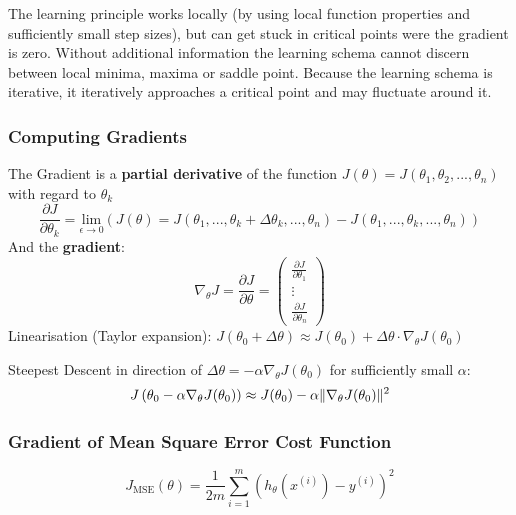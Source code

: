 \documentclass[11pt]{article}
\DeclarePairedDelimiter\norm{\lVert}{\rVert}
\begin{document}
The learning principle works locally (by using local function properties and sufficiently small step sizes), but can get stuck in critical points were the gradient is zero. Without additional information the learning schema cannot discern between local minima, maxima or saddle point. Because the learning schema is iterative, it iteratively approaches a critical point and may fluctuate around it.

\subsubsection{Computing Gradients}

The Gradient is a \textbf{partial derivative} of the function $J(\theta) = J(\theta_1,\theta_2,...,\theta_n)$ with regard to $\theta_k$
\begin{equation*}
	\frac{\partial J}{\partial\theta_k} = \underset{\epsilon\rightarrow0}{\text{lim}}\left( J(\theta) = J(\theta_1,...,\theta_k+\Delta\theta_k,...,\theta_n) - J(\theta_1,...,\theta_k,...,\theta_n) \right)
\end{equation*}
\noindent
And the \textbf{gradient}:
\begin{equation*}
	\nabla_\theta J =\frac{\partial J}{\partial\theta} = \begin{pmatrix}
		\frac{\partial J}{\partial\theta_1}\\
		\vdots\\
		\frac{\partial J}{\partial\theta_n}
	\end{pmatrix}
\end{equation*}
\noindent
Linearisation (Taylor expansion): $J(\theta_0 + \Delta\theta) \approx J(\theta_0) + \Delta\theta\cdot\nabla_\theta J(\theta_0)$

\noindent
Steepest Descent in direction of $\Delta\theta = -\alpha\nabla_\theta J(\theta_0)$ for sufficiently small $\alpha$:
\begin{equation*}
	J\left(\theta_0 - \alpha\nabla_\theta J(\theta_0)\right) \approx J(\theta_0) - \alpha\norm{\nabla_\theta J(\theta_0)}^2
\end{equation*}

\subsubsection{Gradient of Mean Square Error Cost Function}

\begin{equation*}
	J_{\text{MSE}}(\theta) = \frac{1}{2m}\sum_{i=1}^{m}\left(h_\theta(x^{(i)})-y^{(i)}\right)^2
\end{equation*}
\end{document}

